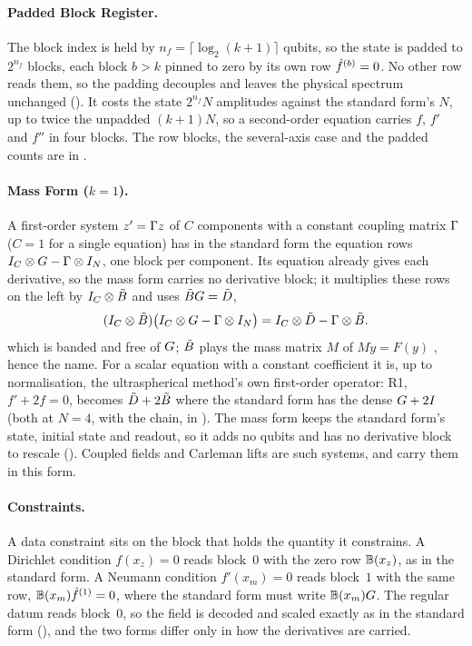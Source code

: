 \paragraph{Padded Block Register.} The block index is held by $n_f=\lceil\log_2(k+1)\rceil$ qubits, so the state is padded to $2^{n_f}$ blocks, each block $b>k$ pinned to zero by its own row $\hat{f}^{(b)}=0$. No other row reads them, so the padding decouples and leaves the physical spectrum unchanged (). It costs the state $2^{n_f}N$ amplitudes against the standard form's $N$, up to twice the unpadded $(k+1)N$, so a second-order equation carries $f$, $f'$ and $f''$ in four blocks. The row blocks, the several-axis case and the padded counts are in .

\paragraph{Mass Form ($k=1$).} A first-order system $z'=\Gamma z$ of $C$ components with a constant coupling matrix $\Gamma$ ($C=1$ for a single equation) has in the standard form the equation rows $I_C\otimes G-\Gamma\otimes I_N$, one block per component. Its equation already gives each derivative, so the mass form carries no derivative block; it multiplies these rows on the left by $I_C\otimes\tilde{B}$ and uses $\tilde{B}G=\tilde{D}$,
\begin{equation}
    (I_C\otimes\tilde{B})\bigl(I_C\otimes G-\Gamma\otimes I_N\bigr)
    = I_C\otimes\tilde{D}-\Gamma\otimes\tilde{B} .
    \label{eq:mass-form}
\end{equation}
which is banded and free of $G$; $\tilde{B}$ plays the mass matrix $M$ of $M\dot y=F(y)$ \cite{hairerwanner1996}, hence the name. For a scalar equation with a constant coefficient it is, up to normalisation, the ultraspherical method's own first-order operator: R1, $f'+2f=0$, becomes $\tilde{D}+2\tilde{B}$ where the standard form has the dense $G+2I$ (both at $N=4$, with the chain, in ). The mass form keeps the standard form's state, initial state and readout, so it adds no qubits and has no derivative block to rescale (). Coupled fields and Carleman lifts are such systems, and  carry them in this form.

\paragraph{Constraints.}\label{sec:descriptor-constraints} A data constraint sits on the block that holds the quantity it constrains. A Dirichlet condition $f(x_z)=0$ reads block~$0$ with the zero row $\mathbb{B}(x_z)$, as in the standard form. A Neumann condition $f'(x_m)=0$ reads block~$1$ with the same row, $\mathbb{B}(x_m)\hat{f}^{(1)}=0$, where the standard form must write $\mathbb{B}(x_m)G$. The regular datum reads block~$0$, so the field is decoded and scaled exactly as in the standard form (), and the two forms differ only in how the derivatives are carried.

